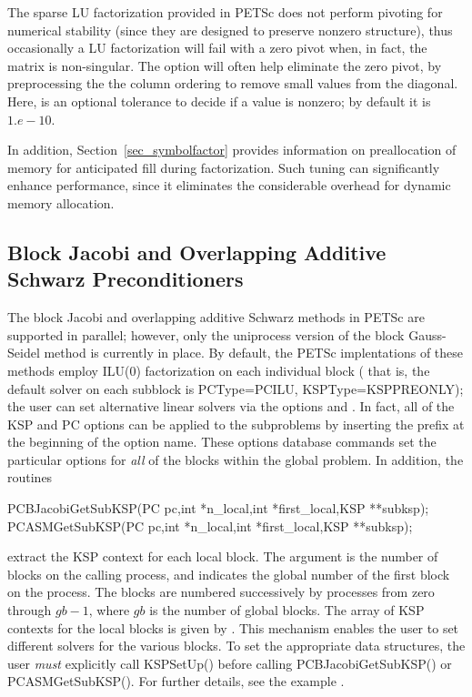 The sparse LU factorization provided in PETSc does not perform pivoting for
numerical stability (since they are designed to preserve nonzero
structure), thus occasionally a LU factorization will fail with a zero
pivot when, in fact, the matrix is non-singular. The option
 
will often help eliminate the zero pivot, by preprocessing the the
column ordering to remove small values from the diagonal. Here, 
is an optional tolerance to decide if a value is nonzero; by default it
is~$ 1.e-10.$


In addition, Section~\ref{sec_symbolfactor} provides information on
preallocation of memory for anticipated fill during factorization.
Such tuning can significantly enhance performance, since it
eliminates the considerable overhead for dynamic memory allocation.

\subsection{Block Jacobi and
            Overlapping Additive Schwarz Preconditioners}
\label{sec_bjacobi}

 
  
The block Jacobi and overlapping additive Schwarz methods in PETSc are
supported in parallel; however, only the uniprocess
version of the block Gauss-Seidel method is currently in place.
By default, the PETSc implentations of these methods
employ ILU(0) factorization on each individual block ( that is, the default solver on each
subblock is PCType=PCILU, KSPType=KSPPREONLY); the user can set alternative linear solvers via the options
 
 and . In fact, all of the KSP
and PC options can be applied to the subproblems by inserting the prefix
 at the beginning of the option name. 
These options database commands set the particular options for {\em all}
of the blocks within the global problem.  In addition, the routines
\begin{tabbing}
  PCBJacobiGetSubKSP(PC pc,int *n\_local,int *first\_local,KSP **subksp);\\
  PCASMGetSubKSP(PC pc,int *n\_local,int *first\_local,KSP **subksp);
\end{tabbing}
extract the KSP context for each local
block.  The argument  is the number of blocks on the
calling process, and  indicates the global number
of the first block on the process. The blocks are numbered
successively by processes from zero through $ gb-1$,
where $ gb $ is the number of global blocks.
The array of KSP contexts for the local blocks is given by .
This mechanism enables the user to set different solvers for the
various blocks.  To set the appropriate data structures, the
user {\em must} explicitly call KSPSetUp()
before calling PCBJacobiGetSubKSP() or
PCASMGetSubKSP().
For further details, see the
example .

